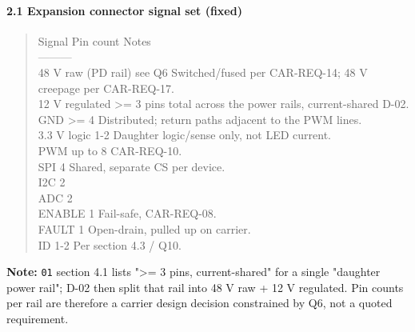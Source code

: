 \documentclass[11pt,a4paper]{article}
\begin{document}
\paragraph*{2.1 Expansion connector signal set (fixed)}
\begin{quote}\small\ttfamily\raggedright
\textbar{} Signal \textbar{} Pin count \textbar{} Notes \textbar{}\\
\textbar{}---\textbar{}---\textbar{}---\textbar{}\\
\textbar{} 48 V raw (PD rail) \textbar{} see Q6 \textbar{} Switched/fused per CAR-REQ-14; 48 V creepage per CAR-REQ-17. \textbar{}\\
\textbar{} 12 V regulated \textbar{} \textgreater{}= 3 pins total across the power rails, current-shared \textbar{} D-02. \textbar{}\\
\textbar{} GND \textbar{} \textgreater{}= 4 \textbar{} Distributed; return paths adjacent to the PWM lines. \textbar{}\\
\textbar{} 3.3 V logic \textbar{} 1-2 \textbar{} Daughter logic/sense only, not LED current. \textbar{}\\
\textbar{} PWM \textbar{} up to 8 \textbar{} CAR-REQ-10. \textbar{}\\
\textbar{} SPI \textbar{} 4 \textbar{} Shared, separate CS per device. \textbar{}\\
\textbar{} I2C \textbar{} 2 \textbar{} \textbar{}\\
\textbar{} ADC \textbar{} 2 \textbar{} \textbar{}\\
\textbar{} ENABLE \textbar{} 1 \textbar{} Fail-safe, CAR-REQ-08. \textbar{}\\
\textbar{} FAULT \textbar{} 1 \textbar{} Open-drain, pulled up on carrier. \textbar{}\\
\textbar{} ID \textbar{} 1-2 \textbar{} Per section 4.3 / Q10. \textbar{}
\end{quote}
\textbf{Note:} \texttt{01} section 4.1 lists "\textgreater{}= 3 pins, current-shared" for a single "daughter power rail"; D-02 then split that rail into 48 V raw + 12 V regulated. Pin counts per rail are therefore a carrier design decision constrained by Q6, not a quoted requirement.
\end{document}

